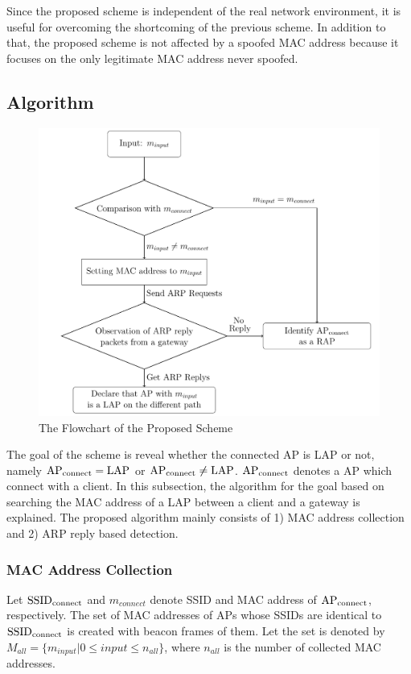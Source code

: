 \documentclass[conference]{IEEEtran}
\newcommand{\SSID}{\rm SSID_{connect}}
\newcommand{\tarAP}{\rm AP_{connect}}
\newcommand{\tarMAC}{m_{connect}}
\begin{document}
Since the proposed scheme is independent of the real network environment, it is useful for overcoming the shortcoming of the previous scheme.
In addition to that, the proposed scheme is not affected by a spoofed MAC address because it focuses on the only legitimate MAC address never spoofed.

\subsection{Algorithm} \label{sec:alg}
\begin{figure}[t]
    \begin{center}
        \includegraphics[scale=0.43]{flowchart/flowchart.pdf}
        \caption{The Flowchart of the Proposed Scheme}
        \label{fig:flowchart}
    \end{center}
\vspace{-2zh}
\end{figure}
The goal of the scheme is reveal whether the connected AP is LAP or not, namely $\tarAP = LAP$ or $\tarAP \ne LAP$.
$\tarAP$ denotes a AP which connect with a client.
In this subsection, the algorithm for the goal based on searching the MAC address of a LAP between a client and a gateway is explained.
The proposed algorithm mainly consists of 1) MAC address collection and 2) ARP reply based detection.

\subsubsection{MAC Address Collection}
Let $\SSID$ and $\tarMAC$ denote SSID and MAC address of $\tarAP$, respectively.
The set of MAC addresses of APs whose SSIDs are identical to $\SSID$  is created with beacon frames of them.
Let the set is denoted by $M_{all}=\{m_{input}|0\le input \le n_{all}  \}$, where $n_{all}$ is the number of collected MAC addresses.
\end{document}
